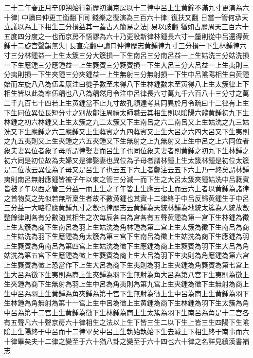 二十二年春正月辛卯朔始行新歷初漢京房以十二律中呂上生黄鐘不滿九寸更演為六十律|{
	中讀曰仲更工衡翻下同}
錢樂之復演為三百六十律|{
	復扶又翻}
日當一管何承天立議以為上下相生三分損益其一蓋古人簡易之法|{
	易以豉翻}
猶如古歷周天三百六十五度四分度之一也而京房不悟謬為六十乃更設新律林鍾長六寸一釐則從中呂還得黄鍾十二旋宫聲韻無失|{
	長直亮翻中讀曰仲律歷志黄鍾律九寸三分損一下生林鍾律六寸三分林鍾益一上生太簇三分大簇損一下生南呂三分南呂益一上生姑洗三分姑洗損一下生應鍾三分應鍾益一上生蕤賓三分蕤賓損一下生大呂三分大呂益一上生夷則三分夷則損一下生夾鍾三分夾鍾益一上生無射三分無射損一下生中呂隂陽相生自黄鍾始而左旋八八為伍孟康注曰從子數至未得八下生林鍾數未至寅得八上生太簇律上下相生皆以此為率伍耦也八八為耦然月令注中呂律長六寸萬九千六百八十三分寸之萬二千九百七十四若上生黄鍾當不止九寸故孔穎達考其同異於月令疏曰十二律有上生下生冋位異位長短分寸之别故鄭注周禮太師職云其相生則以隂陽六體黄鍾初九下生林鍾之初六林鍾又上生太簇之九二太簇又下生南呂之六二南呂又上生姑洗之九三姑洗又下生應鍾之六三應鍾又上生蕤賓之九四蕤賓又上生大呂之六四大呂又下生夷則之九五夷則又上生夾鍾之六五夾鍾又下生無射之上九無射又上生中呂之上六同位者象夫妻異位者象子母所謂律娶妻而呂生子也同位象夫妻者則黄鍾之初九下生林鍾之初六同是初位故為夫婦又是律娶妻也異位為子母者謂林鍾上生太簇林鍾是初位太簇是二位故云異位為子母又是呂生子也云五下六上者鄭注云五下六上乃一終矣謂林鍾夷則南呂無射應鍾皆被子午以東之管三分減一而下生之大呂太簇夾鍾姑洗中呂蕤賓皆被子午以西之管三分益一而上生之子午皆上生應云七上而云六上者以黄鍾為諸律之首物莫之先似若無所稟生者故不數黄鍾也其實十二律終于中呂反歸黄鍾生于中呂三分益一大略得應黄鍾九寸之數也律歷志云黄鍾為天統林鍾為地統太簇為人統故數整餘律則各有分數随其相生之次每辰各自為宫各有五聲黄鍾為第一宫下生林鍾為徵上生太簇為商下生南呂為羽上生姑洗為角林鍾為第二宫上生太簇為徵下生南呂為商上生姑洗為羽下生應鍾為角太簇為第三宫下生南呂為徵上生姑洗為商下生應鍾為羽上生蕤賓為角南呂為第四宫上生姑洗為徵下生應鍾為商上生蕤賓為羽下生大呂為角姑洗為第五宫下生應鍾為徵上生蕤賓為商上生大呂為羽下生夷則為角應鍾為第六宫上生蕤賓為徵上恐當作下上生大呂為商下生夷則為羽上生夾鍾為角蕤賓為第七宫上生大呂為徵下生夷則為商上生夾鍾為羽下生無射為角大呂為第八宫下生夷則為徵上生夾鍾為商下生無射為羽上生中呂為角夷則為第九宫上生夾鍾為徵下生無射為商上生中呂為羽上生黄鍾為角夾鍾為第十宫下生無射為徵上生中呂為商上生黄鍾為羽下生林鍾為角無射為第十一宫上生中呂為徵上生黄鍾為商下生林鍾為羽下生太簇為角中呂為第十二宫上生黄鍾為徵下生林鍾為商上生太簇為羽下生南呂為角是十二宫各有五聲凡六十聲京房六十律相生之法以上生下皆三生二以下生上皆三生四陽下生隂隂上生陽終于中呂而十二律畢矣中呂上生執始執始下生去滅上下相生終于南事而六十律畢矣夫十二律之變至于六十猶八卦之變至于六十四也六十律之名詳見續漢書補志}
